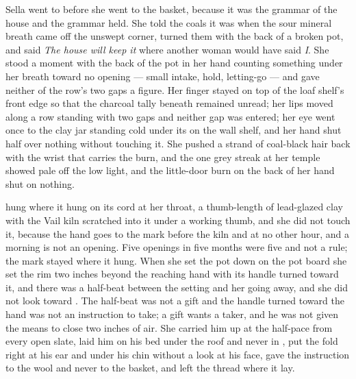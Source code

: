 \scenebreak

Sella went to  before she went to the basket, because it was the grammar of the house and the grammar held. She told the coals it was  when the sour mineral breath came off the unswept corner, turned them with the back of a broken pot, and said \emph{The house will keep it} where another woman would have said \emph{I}. She stood a moment with the back of the pot in her hand counting something under her breath toward no opening --- small intake, hold, letting-go --- and gave neither of the row's two gaps a figure. Her finger stayed on top of the loaf shelf's front edge so that the charcoal tally beneath remained unread; her lips moved along a row standing with two gaps and neither gap was entered; her eye went once to the clay jar standing cold under its  on the wall shelf, and her hand shut half over nothing without touching it. She pushed a strand of coal-black hair back with the wrist that carries the burn, and the one grey streak at her temple showed pale off the low light, and the little-door burn on the back of her hand shut on nothing.

 hung where it hung on its cord at her throat, a thumb-length of lead-glazed clay with the Vail kiln scratched into it under a working thumb, and she did not touch it, because the hand goes to the mark before the kiln and at no other hour, and a morning is not an opening. Five openings in five months were five and not a rule; the mark stayed where it hung. When she set the pot down on the pot board she set the rim two inches beyond the reaching hand with its handle turned toward it, and there was a half-beat between the setting and her going away, and she did not look toward . The half-beat was not a gift and the handle turned toward the hand was not an instruction to take; a gift wants a taker, and he was not given the means to close two inches of air. She carried him up at the half-pace from every open slate, laid him on his bed under the roof and never in , put the fold right at his ear and under his chin without a look at his face, gave the instruction to the wool and never to the basket, and left the thread where it lay.


